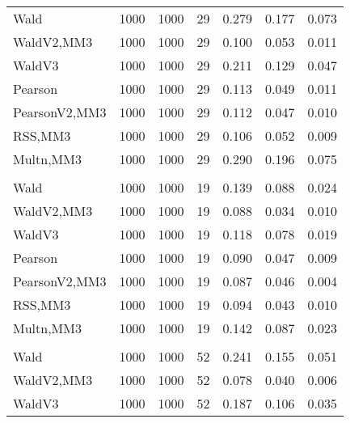 \documentclass[
]{article}
\begin{document}
\begin{table}[H]
{\begin{tabular}[t]{lrrrrrr}
\hspace{1em}Wald & 1000 & 1000 & 29 & 0.279 & 0.177 & 0.073\\
\hspace{1em}WaldV2,MM3 & 1000 & 1000 & 29 & 0.100 & 0.053 & 0.011\\
\hspace{1em}WaldV3 & 1000 & 1000 & 29 & 0.211 & 0.129 & 0.047\\
\hspace{1em}Pearson & 1000 & 1000 & 29 & 0.113 & 0.049 & 0.011\\
\hspace{1em}PearsonV2,MM3 & 1000 & 1000 & 29 & 0.112 & 0.047 & 0.010\\
\hspace{1em}RSS,MM3 & 1000 & 1000 & 29 & 0.106 & 0.052 & 0.009\\
\hspace{1em}Multn,MM3 & 1000 & 1000 & 29 & 0.290 & 0.196 & 0.075\\
\addlinespace[0.3em]
\multicolumn{7}{l}{\textbf{2F 10V}}\\
\hspace{1em}Wald & 1000 & 1000 & 19 & 0.139 & 0.088 & 0.024\\
\hspace{1em}WaldV2,MM3 & 1000 & 1000 & 19 & 0.088 & 0.034 & 0.010\\
\hspace{1em}WaldV3 & 1000 & 1000 & 19 & 0.118 & 0.078 & 0.019\\
\hspace{1em}Pearson & 1000 & 1000 & 19 & 0.090 & 0.047 & 0.009\\
\hspace{1em}PearsonV2,MM3 & 1000 & 1000 & 19 & 0.087 & 0.046 & 0.004\\
\hspace{1em}RSS,MM3 & 1000 & 1000 & 19 & 0.094 & 0.043 & 0.010\\
\hspace{1em}Multn,MM3 & 1000 & 1000 & 19 & 0.142 & 0.087 & 0.023\\
\addlinespace[0.3em]
\multicolumn{7}{l}{\textbf{3F 15V}}\\
\hspace{1em}Wald & 1000 & 1000 & 52 & 0.241 & 0.155 & 0.051\\
\hspace{1em}WaldV2,MM3 & 1000 & 1000 & 52 & 0.078 & 0.040 & 0.006\\
\hspace{1em}WaldV3 & 1000 & 1000 & 52 & 0.187 & 0.106 & 0.035\\

\end{tabular}}
\end{table}
\end{document}
